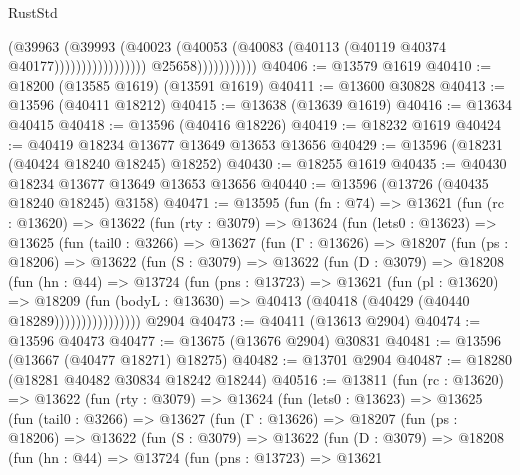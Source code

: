 \begin{lexlean}{RustStd}
\begin{coremodule}
                                              (@39963
                                                (@39993
                                                  (@40023
                                                    (@40053
                                                      (@40083
                                                        (@40113
                                                          (@40119 @40374 @40177)))))))))))))))))
                          @25658)))))))))))
@40406 := @13579 @1619
@40410 := @18200 (@13585 @1619) (@13591 @1619)
@40411 := @13600 @30828
@40413 := @13596 (@40411 @18212)
@40415 := @13638 (@13639 @1619)
@40416 := @13634 @40415
@40418 := @13596 (@40416 @18226)
@40419 := @18232 @1619
@40424 := @40419 @18234 @13677 @13649 @13653 @13656
@40429 := @13596 (@18231 (@40424 @18240 @18245) @18252)
@40430 := @18255 @1619
@40435 := @40430 @18234 @13677 @13649 @13653 @13656
@40440 := @13596 (@13726 (@40435 @18240 @18245) @3158)
@40471 := @13595
    (fun (fn : @74) =>
    @13621
      (fun (rc : @13620) =>
      @13622
        (fun (rty : @3079) =>
        @13624
          (fun (lets0 : @13623) =>
          @13625
            (fun (tail0 : @3266) =>
            @13627
              (fun (Γ : @13626) =>
              @18207
                (fun (ps : @18206) =>
                @13622
                  (fun (S : @3079) =>
                  @13622
                    (fun (D : @3079) =>
                    @18208
                      (fun (hn : @44) =>
                      @13724
                        (fun (pns : @13723) =>
                        @13621
                          (fun (pl : @13620) =>
                          @18209
                            (fun (bodyL : @13630) =>
                            @40413 (@40418 (@40429 (@40440 @18289))))))))))))))))
    @2904
@40473 := @40411 (@13613 @2904)
@40474 := @13596 @40473
@40477 := @13675 (@13676 @2904) @30831
@40481 := @13596 (@13667 (@40477 @18271) @18275)
@40482 := @13701 @2904
@40487 := @18280 (@18281 @40482 @30834 @18242 @18244)
@40516 := @13811
    (fun (rc : @13620) =>
    @13622
      (fun (rty : @3079) =>
      @13624
        (fun (lets0 : @13623) =>
        @13625
          (fun (tail0 : @3266) =>
          @13627
            (fun (Γ : @13626) =>
            @18207
              (fun (ps : @18206) =>
              @13622
                (fun (S : @3079) =>
                @13622
                  (fun (D : @3079) =>
                  @18208
                    (fun (hn : @44) =>
                    @13724
                      (fun (pns : @13723) =>
                      @13621

\end{coremodule}
\end{lexlean}
